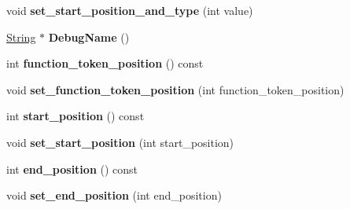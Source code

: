 \begin{DoxyCompactItemize}
\item 
\hypertarget{classv8_1_1internal_1_1_shared_function_info_a2344c3dfdd6f65066913a24ba5c2c767}{}void {\bfseries set\+\_\+start\+\_\+position\+\_\+and\+\_\+type} (int value)\label{classv8_1_1internal_1_1_shared_function_info_a2344c3dfdd6f65066913a24ba5c2c767}

\item 
\hypertarget{classv8_1_1internal_1_1_shared_function_info_ac99fd9814db1dd8266eaf62bfd557ada}{}\hyperlink{classv8_1_1internal_1_1_string}{String} $\ast$ {\bfseries Debug\+Name} ()\label{classv8_1_1internal_1_1_shared_function_info_ac99fd9814db1dd8266eaf62bfd557ada}

\item 
\hypertarget{classv8_1_1internal_1_1_shared_function_info_a5b7a18812dfb0269806e52073d1b91d8}{}int {\bfseries function\+\_\+token\+\_\+position} () const \label{classv8_1_1internal_1_1_shared_function_info_a5b7a18812dfb0269806e52073d1b91d8}

\item 
\hypertarget{classv8_1_1internal_1_1_shared_function_info_a2f9fa5e11c55f28fe3a606d7411e9446}{}void {\bfseries set\+\_\+function\+\_\+token\+\_\+position} (int function\+\_\+token\+\_\+position)\label{classv8_1_1internal_1_1_shared_function_info_a2f9fa5e11c55f28fe3a606d7411e9446}

\item 
\hypertarget{classv8_1_1internal_1_1_shared_function_info_a0eb9c75c3fdae7d2007cbe23043abc73}{}int {\bfseries start\+\_\+position} () const \label{classv8_1_1internal_1_1_shared_function_info_a0eb9c75c3fdae7d2007cbe23043abc73}

\item 
\hypertarget{classv8_1_1internal_1_1_shared_function_info_a2dc3eb34dde73ca6833bf32f5d5fcc41}{}void {\bfseries set\+\_\+start\+\_\+position} (int start\+\_\+position)\label{classv8_1_1internal_1_1_shared_function_info_a2dc3eb34dde73ca6833bf32f5d5fcc41}

\item 
\hypertarget{classv8_1_1internal_1_1_shared_function_info_ae56b51628788a0ce481a69296f21acf3}{}int {\bfseries end\+\_\+position} () const \label{classv8_1_1internal_1_1_shared_function_info_ae56b51628788a0ce481a69296f21acf3}

\item 
\hypertarget{classv8_1_1internal_1_1_shared_function_info_a552ba314feef593fb25cf9cfcf83ae8e}{}void {\bfseries set\+\_\+end\+\_\+position} (int end\+\_\+position)\label{classv8_1_1internal_1_1_shared_function_info_a552ba314feef593fb25cf9cfcf83ae8e}


\end{DoxyCompactItemize}
